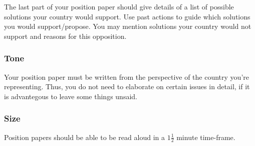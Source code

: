 \documentclass[11pt,a4paper]{report}
\begin{document}
The last part of your position paper should give details of a list of possible solutions your country would support. Use past actions to guide which solutions you would support/propose. You may mention solutions your country would not support and reasons for this opposition.

\subsubsection{Tone}

Your position paper must be written from the perspective of the country you're representing. Thus, you do not need to elaborate on certain issues in detail, if it is advantegous to leave some things unsaid. 

\subsubsection{Size}

Position papers should be able to be read aloud in a $1 \frac{1}{2}$ minute time-frame.
\end{document}
